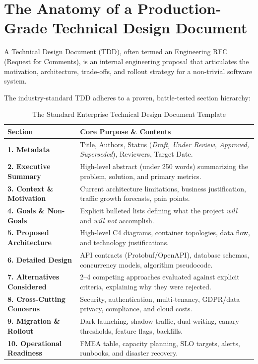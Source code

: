 \section{The Anatomy of a Production-Grade Technical Design Document}

A Technical Design Document (TDD), often termed an Engineering RFC (Request for Comments), is an internal engineering proposal that articulates the motivation, architecture, trade-offs, and rollout strategy for a non-trivial software system.

The industry-standard TDD adheres to a proven, battle-tested section hierarchy:

\begin{table}[htbp]
\centering\small
\begin{tabular}{lp{10.5cm}}
\toprule
\textbf{Section} & \textbf{Core Purpose \& Contents} \\
\midrule
\textbf{1. Metadata} & Title, Authors, Status (\textit{Draft, Under Review, Approved, Superseded}), Reviewers, Target Date. \\
\textbf{2. Executive Summary} & High-level abstract (under 250 words) summarizing the problem, solution, and primary metrics. \\
\textbf{3. Context \& Motivation} & Current architecture limitations, business justification, traffic growth forecasts, pain points. \\
\textbf{4. Goals \& Non-Goals} & Explicit bulleted lists defining what the project \textit{will} and \textit{will not} accomplish. \\
\textbf{5. Proposed Architecture} & High-level C4 diagrams, container topologies, data flow, and technology justifications. \\
\textbf{6. Detailed Design} & API contracts (Protobuf/OpenAPI), database schemas, concurrency models, algorithm pseudocode. \\
\textbf{7. Alternatives Considered} & 2--4 competing approaches evaluated against explicit criteria, explaining why they were rejected. \\
\textbf{8. Cross-Cutting Concerns} & Security, authentication, multi-tenancy, GDPR/data privacy, compliance, and cloud costs. \\
\textbf{9. Migration \& Rollout} & Dark launching, shadow traffic, dual-writing, canary thresholds, feature flags, backfills. \\
\textbf{10. Operational Readiness} & FMEA table, capacity planning, SLO targets, alerts, runbooks, and disaster recovery. \\
\bottomrule
\end{tabular}
\caption{The Standard Enterprise Technical Design Document Template}
\label{tab:tdd-template}
\end{table}

